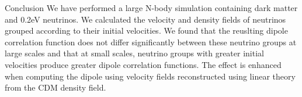 \begin{section}{Conclusion}
  \label{sec:conclusion}
  We have performed a large N-body simulation containing dark matter
  and 0.2eV neutrinos. We calculated the velocity and density fields
  of neutrinos grouped according to their initial velocities. We found
  that the reuslting dipole correlation function does not differ significantly
  between these neutrino groups at large scales and that at small scales, 
  neutrino groups with greater initial velocities produce greater dipole 
  correlation functions. The effect is enhanced when computing the dipole 
  using velocity fields reconstructed using linear theory from the CDM density 
  field.
\end{section}

